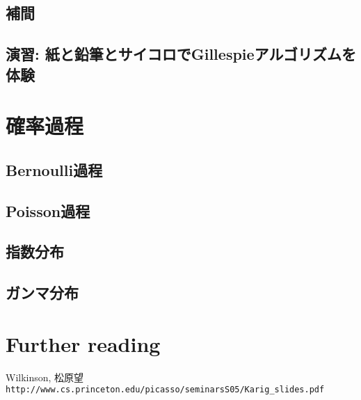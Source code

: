 \subsection{補間}


\subsection{演習: 紙と鉛筆とサイコロでGillespieアルゴリズムを体験}

\section{確率過程}
\subsection{Bernoulli過程}
\subsection{Poisson過程}
\subsection{指数分布}
\subsection{ガンマ分布}

\section{Further reading}
Wilkinson, 松原望
\verb+http://www.cs.princeton.edu/picasso/seminarsS05/Karig_slides.pdf+

